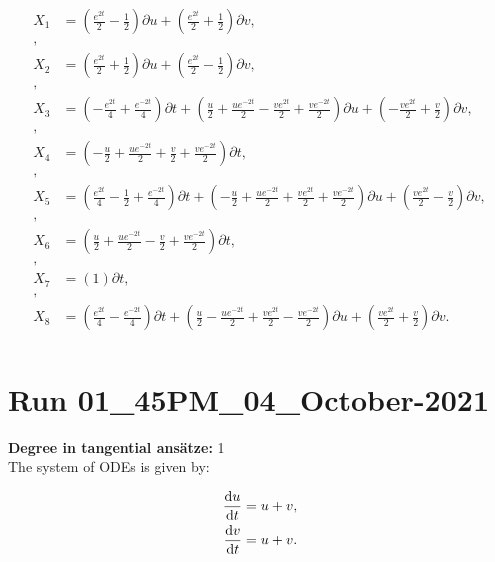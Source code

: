 \begin{align*}
X_{1}&=\left( \frac{e^{2 t}}{2} - \frac{1}{2} \right)\partial u+\left( \frac{e^{2 t}}{2} + \frac{1}{2} \right)\partial v,\\
,\\
X_{2}&=\left( \frac{e^{2 t}}{2} + \frac{1}{2} \right)\partial u+\left( \frac{e^{2 t}}{2} - \frac{1}{2} \right)\partial v,\\
,\\
X_{3}&=\left( - \frac{e^{2 t}}{4} + \frac{e^{- 2 t}}{4} \right)\partial t+\left( \frac{u}{2} + \frac{u e^{- 2 t}}{2} - \frac{v e^{2 t}}{2} + \frac{v e^{- 2 t}}{2} \right)\partial u+\left( - \frac{v e^{2 t}}{2} + \frac{v}{2} \right)\partial v,\\
,\\
X_{4}&=\left( - \frac{u}{2} + \frac{u e^{- 2 t}}{2} + \frac{v}{2} + \frac{v e^{- 2 t}}{2} \right)\partial t,\\
,\\
X_{5}&=\left( \frac{e^{2 t}}{4} - \frac{1}{2} + \frac{e^{- 2 t}}{4} \right)\partial t+\left( - \frac{u}{2} + \frac{u e^{- 2 t}}{2} + \frac{v e^{2 t}}{2} + \frac{v e^{- 2 t}}{2} \right)\partial u+\left( \frac{v e^{2 t}}{2} - \frac{v}{2} \right)\partial v,\\
,\\
X_{6}&=\left( \frac{u}{2} + \frac{u e^{- 2 t}}{2} - \frac{v}{2} + \frac{v e^{- 2 t}}{2} \right)\partial t,\\
,\\
X_{7}&=\left( 1 \right)\partial t,\\
,\\
X_{8}&=\left( \frac{e^{2 t}}{4} - \frac{e^{- 2 t}}{4} \right)\partial t+\left( \frac{u}{2} - \frac{u e^{- 2 t}}{2} + \frac{v e^{2 t}}{2} - \frac{v e^{- 2 t}}{2} \right)\partial u+\left( \frac{v e^{2 t}}{2} + \frac{v}{2} \right)\partial v.\\
\end{align*}
\section*{Run 01\_45PM\_04\_October-2021}
\textbf{Degree in tangential ansätze:}	1\\
The system of ODEs is given by:

\begin{align*}
\dv{u}{t}&=u + v,\\
\dv{v}{t}&=u + v.\\
\end{align*}

